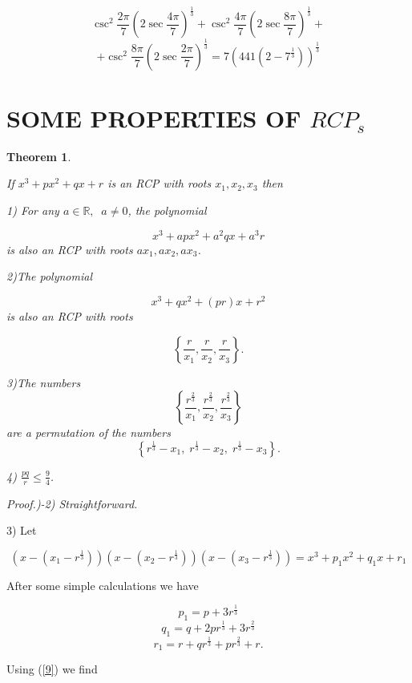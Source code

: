 \documentclass[12pt,oneside,english]{amsart}
\newtheorem{theorem}{Theorem}
\begin{document}
$$
\csc^2\frac{2\pi}{7}\left(2\sec\frac{4\pi}{7}\right)^{\frac 1
3}+\csc^2\frac{4\pi}{7}\left(2\sec\frac {8\pi}{7}\right)^{\frac 1
3}+
$$
\begin{equation}\label{23}
+\csc^2\frac{8\pi}{7}\left(2\sec\frac{2\pi}{7}\right)^{\frac 1
3}=7\left(441(2-7^{\frac 1 3})\right)^{\frac 1 3}
\end{equation}



\section{SOME PROPERTIES OF $ RCP_s $}\label{s3}



\begin{theorem}\label{thm3}

\slshape If $x^3+px^2+qx+r$ is an RCP with roots ${x_1, x_2, x_3}$
then


1) For any $a\in\mathbb{R},\;\;a\neq 0$, the polynomial \upshape

$$x^3+apx^2+a^2qx+a^3r$$
\slshape is also an RCP with roots\upshape\;\; ${ax_1, ax_2, ax_3}$.


2)\slshape The polynomial\upshape

$$
x^3+qx^2+(pr)x+r^2
$$
\slshape is
also an RCP with roots \upshape

\newpage


$$
\left\{\frac{r}{x_1}, \frac{r}{x_2}, \frac{r}{x_3}\right\}.
$$


3)\slshape The numbers\upshape $$\left\{\frac{r^{\frac 2 3}}{x_1},
\frac{r^{\frac 2 3}}{x_2}, \frac{r^{\frac 2 3}}{x_3}\right\}$$
\slshape are a permutation of the numbers \upshape $$\left\{r^{\frac
1 3}-x_1,\;r^{\frac 1 3}-x_2,\;r^{\frac 1 3}-x_3\right\}.$$


4) $\frac{pq}{r}\leq \frac 9 4$.
\end{theorem}



\slshape Proof.)-2)  Straightforward.

3) Let

$$
(x-(x_1-r^{\frac 1 3}))(x-(x_2-r^{\frac 1 3}))(x-(x_3-r^{\frac 1
3}))=x^3+p_1x^2+q_1x+r_1
$$

After some simple calculations we have

$$
p_1=p+3r^{\frac 1 3}
$$
$$
q_1=q+2pr^{\frac 1 3}+3r^{\frac 2 3}
$$
$$
r_1=r+qr^{\frac 1 3}+pr^{\frac 2 3}+r.
$$

Using (\ref{9}) we find
\end{document}
